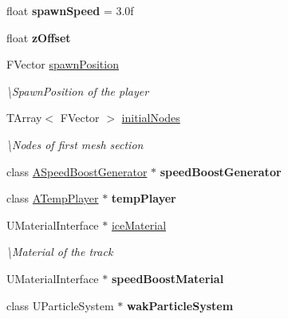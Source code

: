 \begin{DoxyCompactItemize}
\mbox{\label{class_a_track_generator_bezier_a52f1d614e304b18fed3ff0428ed6388a}} 
float {\bfseries spawn\+Speed} = 3.\+0f
\item 
\mbox{\label{class_a_track_generator_bezier_a56ede95f18e151488eac59cf977df7c5}} 
float {\bfseries z\+Offset}
\item 
\mbox{\label{class_a_track_generator_bezier_ae059c4bff2cd7b2f90a15e5e401bfcba}} 
F\+Vector \mbox{\hyperlink{class_a_track_generator_bezier_ae059c4bff2cd7b2f90a15e5e401bfcba}{spawn\+Position}}
\begin{DoxyCompactList}\small\item\em \textbackslash{}\+Spawn\+Position of the player \end{DoxyCompactList}\item 
T\+Array$<$ F\+Vector $>$ \mbox{\hyperlink{class_a_track_generator_bezier_afcd90d4b734a7aa568136c4a99fedc90}{initial\+Nodes}}
\begin{DoxyCompactList}\small\item\em \textbackslash{}\+Nodes of first mesh section \end{DoxyCompactList}\item 
\mbox{\label{class_a_track_generator_bezier_a88e84c85b4e4a3e85bc8330d41cea021}} 
class \mbox{\hyperlink{class_a_speed_boost_generator}{A\+Speed\+Boost\+Generator}} $\ast$ {\bfseries speed\+Boost\+Generator}
\item 
\mbox{\label{class_a_track_generator_bezier_ac6b1c1a0d3b8d7c68504a5e060266de8}} 
class \mbox{\hyperlink{class_a_temp_player}{A\+Temp\+Player}} $\ast$ {\bfseries temp\+Player}
\item 
\mbox{\label{class_a_track_generator_bezier_a40fd958794b48264d53aef7b825a7664}} 
U\+Material\+Interface $\ast$ \mbox{\hyperlink{class_a_track_generator_bezier_a40fd958794b48264d53aef7b825a7664}{ice\+Material}}
\begin{DoxyCompactList}\small\item\em \textbackslash{}\+Material of the track \end{DoxyCompactList}\item 
\mbox{\label{class_a_track_generator_bezier_a0e97ecef6b1559e084b0e08fb91ba5e9}} 
U\+Material\+Interface $\ast$ {\bfseries speed\+Boost\+Material}
\item 
\mbox{\label{class_a_track_generator_bezier_a2ad18c177748032fab1f2e6377c65dd8}} 
class U\+Particle\+System $\ast$ {\bfseries wak\+Particle\+System}
\end{DoxyCompactItemize}
